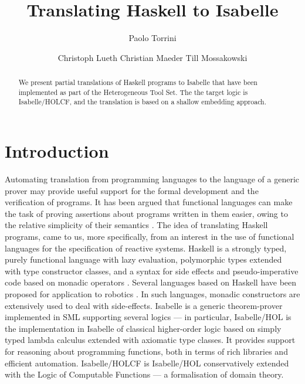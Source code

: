 \documentclass{llncs}
\begin{document}
\title{Translating Haskell to Isabelle}
\author{ Paolo Torrini \and
  Christoph Lueth
  Christian Maeder
  Till Mossakowski
}

\maketitle

\begin{abstract}
  We present partial translations of Haskell programs to Isabelle that have
  been implemented as part of the Heterogeneous Tool Set. The the target logic
  is Isabelle/HOLCF, and the translation is based on a shallow embedding
  approach.
\end{abstract}

\sloppy

\section{Introduction}
\label{intro}

Automating translation from programming languages to the language of a generic
prover may provide useful support for the formal development and the
verification of programs. It has been argued that functional languages can
make the task of proving assertions about programs written in them easier,
owing to the relative simplicity of their semantics
\cite{Thompson92,Thompson95}. The idea of translating Haskell programs, came
to us, more specifically, from an interest in the use of functional languages
for the specification of reactive systems. Haskell is a strongly typed, purely
functional language with lazy evaluation, polymorphic types extended with type
constructor classes, and a syntax for side effects and pseudo-imperative code
based on monadic operators \cite{HaskellRep}.  Several languages based on
Haskell have been proposed for application to robotics \cite{phh99,Hudak2003}.
In such languages, monadic constructors are extensively used to deal with
side-effects. Isabelle is a generic theorem-prover implemented in SML
supporting several logics --- in particular, Isabelle/HOL is the
implementation in Isabelle of classical higher-order logic based on simply
typed lambda calculus extended with axiomatic type classes. It provides
support for reasoning about programming functions, both in terms of rich
libraries and efficient automation.  Isabelle/HOLCF \cite{holcf}
\cite{Paulson94isa,holcf} is Isabelle/HOL conservatively extended with the
Logic of Computable Functions --- a formalisation of domain theory.
\end{document}
